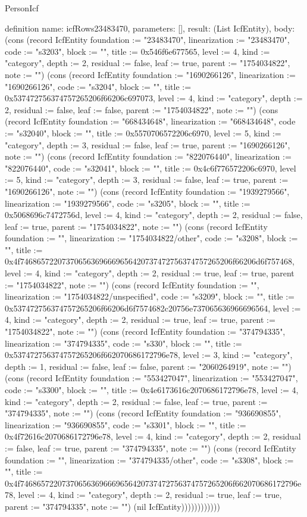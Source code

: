\begin{lexlean}{PersonIcf}
\begin{semanticmodule}
definition{
  name: icfRows23483470,
  parameters: [],
  result: (List IcfEntity),
  body: (cons (record IcfEntity {foundation := "23483470", linearization := "23483470", code := "s3203", block := "", title := 0x546f6e677565, level := 4, kind := "category", depth := 2, residual := false, leaf := true, parent := "1754034822", note := ""}) (cons (record IcfEntity {foundation := "1690266126", linearization := "1690266126", code := "s3204", block := "", title := 0x537472756374757265206f66206c697073, level := 4, kind := "category", depth := 2, residual := false, leaf := false, parent := "1754034822", note := ""}) (cons (record IcfEntity {foundation := "668434648", linearization := "668434648", code := "s32040", block := "", title := 0x5570706572206c6970, level := 5, kind := "category", depth := 3, residual := false, leaf := true, parent := "1690266126", note := ""}) (cons (record IcfEntity {foundation := "822076440", linearization := "822076440", code := "s32041", block := "", title := 0x4c6f776572206c6970, level := 5, kind := "category", depth := 3, residual := false, leaf := true, parent := "1690266126", note := ""}) (cons (record IcfEntity {foundation := "1939279566", linearization := "1939279566", code := "s3205", block := "", title := 0x5068696c7472756d, level := 4, kind := "category", depth := 2, residual := false, leaf := true, parent := "1754034822", note := ""}) (cons (record IcfEntity {foundation := "", linearization := "1754034822/other", code := "s3208", block := "", title := 0x4f746865722073706563696669656420737472756374757265206f66206d6f757468, level := 4, kind := "category", depth := 2, residual := true, leaf := true, parent := "1754034822", note := ""}) (cons (record IcfEntity {foundation := "", linearization := "1754034822/unspecified", code := "s3209", block := "", title := 0x537472756374757265206f66206d6f7574682c20756e737065636966696564, level := 4, kind := "category", depth := 2, residual := true, leaf := true, parent := "1754034822", note := ""}) (cons (record IcfEntity {foundation := "374794335", linearization := "374794335", code := "s330", block := "", title := 0x537472756374757265206f662070686172796e78, level := 3, kind := "category", depth := 1, residual := false, leaf := false, parent := "2060264919", note := ""}) (cons (record IcfEntity {foundation := "553427047", linearization := "553427047", code := "s3300", block := "", title := 0x4e6173616c2070686172796e78, level := 4, kind := "category", depth := 2, residual := false, leaf := true, parent := "374794335", note := ""}) (cons (record IcfEntity {foundation := "936690855", linearization := "936690855", code := "s3301", block := "", title := 0x4f72616c2070686172796e78, level := 4, kind := "category", depth := 2, residual := false, leaf := true, parent := "374794335", note := ""}) (cons (record IcfEntity {foundation := "", linearization := "374794335/other", code := "s3308", block := "", title := 0x4f746865722073706563696669656420737472756374757265206f662070686172796e78, level := 4, kind := "category", depth := 2, residual := true, leaf := true, parent := "374794335", note := ""}) (nil IcfEntity))))))))))))
}


\end{semanticmodule}
\end{lexlean}

